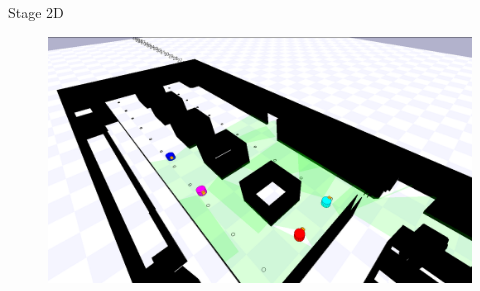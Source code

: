     \begin{frame}{Stage 2D}
        \begin{figure}[hbt]
            \centering
            \includegraphics[width=\textwidth]{img/prospective}
        \end{figure}
    \end{frame}


